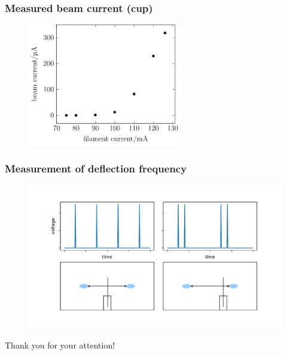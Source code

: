 \documentclass[aspectratio=169]{beamer}
\begin{document}

\begin{frame}
	\frametitle{Measured beam current (cup)}
	\begin{figure}[h]
		\centering
		\includegraphics[width=0.6\textwidth]{../Figures/Thesis-figure6.pdf}
	\end{figure}
\end{frame}

\begin{frame}
	\frametitle{Measurement of deflection frequency}
	\begin{figure}
		\centering
		\includegraphics[width=0.8\linewidth]{../Chapters/beam-characterization/Spikes}
	\end{figure}
\end{frame}


\begin{frame}
\Huge{\centerline{Thank you for your attention!}}
\end{frame}

\end{document}
